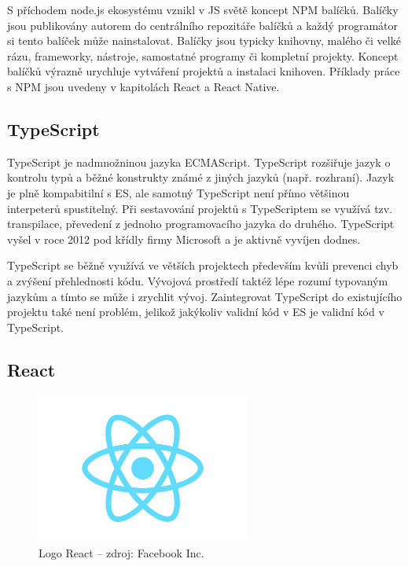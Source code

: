 S příchodem node.js ekosystému vznikl v JS světě koncept NPM balíčků. Balíčky jsou publikovány autorem do centrálního repozitáře balíčků a každý programátor si tento balíček může nainstalovat. Balíčky jsou typicky knihovny, malého či velké rázu, frameworky, nástroje, samostatné programy či kompletní projekty. Koncept balíčků výrazně urychluje vytváření projektů a instalaci knihoven. Příklady práce s NPM jsou uvedeny v kapitolách React a React Native.

\subsection{TypeScript}

TypeScript je nadmnožninou jazyka ECMAScript. TypeScript rozšiřuje jazyk o kontrolu typů a běžné konstrukty známé z jiných jazyků \cite{freeman2019essential} (např. rozhraní). Jazyk je plně kompabitilní s ES, ale samotný TypeScript není přímo většinou interpeterů spustitelný. Při sestavování projektů s TypeScriptem se využívá tzv. transpilace, převedení z jednoho programovacího jazyka do druhého. TypeScript vyšel v roce 2012 pod křídly firmy Microsoft a je aktivně vyvíjen dodnes.

TypeScript se běžně využívá ve větších projektech především kvůli prevenci chyb a zvýšení přehlednosti kódu. Vývojová prostředí taktéž lépe rozumí typovaným jazykům a tímto se může i zrychlit vývoj. Zaintegrovat TypeScript do existujícího projektu také není problém, jelikož jakýkoliv validní kód v ES je validní kód v TypeScript.

\subsection{React}

\begin{figure}
	\begin{center}
		\includegraphics[width=70mm]{img/react-logo.png}
	\end{center}
	\caption{Logo React -- zdroj: Facebook Inc.}
\end{figure}

